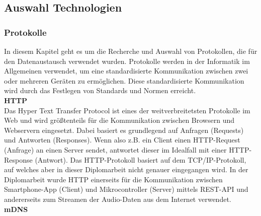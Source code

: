 \documentclass[11pt, twoside]{article}
\begin{document}
\subsection{Auswahl Technologien}
\subsubsection{Protokolle}
In diesem Kapitel geht es um die Recherche und Auswahl von Protokollen, die für den Datenaustausch verwendet wurden.
Protokolle werden in der Informatik im Allgemeinen verwendet, um eine standardisierte Kommunikation zwischen zwei oder mehreren Geräten zu ermöglichen. Diese standardisierte Kommunikation wird durch das Festlegen von Standards und Normen erreicht. \parencite[vgl.][]{noauthor_urlpi16_nodate}
\newline \\
\textbf{HTTP} \\
Das \glqq Hyper Text Transfer Protocol\grqq{} ist eines der weitverbreitetsten Protokolle im Web und wird größtenteils für die Kommunikation zwischen Browsern und Webservern eingesetzt. Dabei basiert es grundlegend auf Anfragen (Requests) und Antworten (Responses). Wenn also z.B. ein Client einen HTTP-Request (Anfrage) an einen Server sendet, antwortet dieser im Idealfall mit einer HTTP-Response (Antwort). Das HTTP-Protokoll basiert auf dem TCP/IP-Protokoll, auf welches aber in dieser Diplomarbeit nicht genauer eingegangen wird. In der Diplomarbeit wurde HTTP einerseits für die Kommunikation zwischen Smartphone-App (Client) und Mikrocontroller (Server) mittels REST-API und andererseits zum Streamen der Audio-Daten aus dem Internet verwendet. \parencite[vgl.][]{noauthor_urlpi01_2020}
\newline \\
\textbf{mDNS} \\
\end{document}
